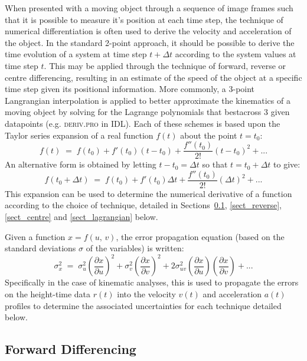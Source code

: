 \documentclass[namedreferences]{SolarPhysics}
\begin{document}
\begin{article}
When presented with a moving object through a sequence of image frames such that it is possible to measure it's position at each time step, the technique of numerical differentiation is often used to derive the velocity and acceleration of the object. In the standard 2-point approach, it should be possible to derive the time evolution of a system at time step $t+\Delta t$ according to the system values at time step $t$. This may be applied through the technique of forward, reverse or centre differencing, resulting in an estimate of the speed of the object at a specific time step given its positional information. More commonly, a 3-point Langrangian interpolation is applied to better approximate the kinematics of a moving object by solving for the Lagrange polynomials that bestacross 3 given datapoints (e.g. \textsc{deriv.pro} in IDL). Each of these schemes is based upon the Taylor series expansion of a real function $f(t)$ about the point $t=t_0$:
\begin{equation}
\label{taylor1}
f(t) \; = \; f(t_0) + f'(t_0)(t-t_0) +  \frac{f''(t_0)}{2!}(t-t_0)^{2}   + ...
\end{equation}
An alternative form is obtained by letting $t-t_0=\Delta t$ so that $t=t_0+\Delta t$ to give:
\begin{equation}
\label{taylor2}
f(t_0+\Delta t) \; = \; f(t_0)+f'(t_0)\Delta t +  \frac{f''(t_0)}{2!}(\Delta t)^{2}  + ...
\end{equation}
This expansion can be used to determine the numerical derivative of a function according to the choice of technique, detailed in Sections~\ref{sect_forward}, \ref{sect_reverse}, \ref{sect_centre} and \ref{sect_lagrangian} below.

Given a function $x=f(u,\,v)$, the error propagation equation (based on the standard deviations $\sigma$ of the variables) is written:
\begin{equation}
\sigma_x^2 \; = \; \sigma_u^2 \left(\frac{\partial x}{\partial u}\right) ^2 + \sigma_v^2 \left( \frac{\partial x}{\partial v} \right) ^2 + 2 \sigma_{uv}^2 \left( \frac{\partial x}{\partial u} \right) \left( \frac{\partial x}{\partial v} \right) + ...
\end{equation}
Specifically in the case of kinematic analyses, this is used to propagate the errors on the height-time data $r(t)$ into the velocity $v(t)$ and acceleration $a(t)$ profiles to determine the associated uncertainties for each technique detailed below.

\subsection{Forward Differencing} %
\label{sect_forward}


\end{article}
\end{document}
